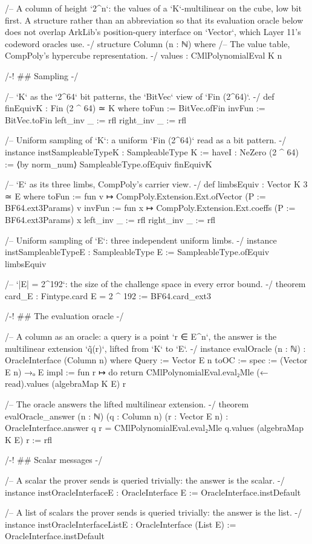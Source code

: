 \begin{leancode}
/-- A column of height `2^n`: the values of a `K`-multilinear on the cube, low bit first. A
structure rather than an abbreviation so that its evaluation oracle below does not overlap
ArkLib's position-query interface on `Vector`, which Layer 11's codeword oracles use. -/
structure Column (n : ℕ) where
  /-- The value table, CompPoly's hypercube representation. -/
  values : CMlPolynomialEval K n

/-! ## Sampling -/

/-- `K` as the `2^64` bit patterns, the `BitVec` view of `Fin (2^64)`. -/
def finEquivK : Fin (2 ^ 64) ≃ K where
  toFun := BitVec.ofFin
  invFun := BitVec.toFin
  left_inv _ := rfl
  right_inv _ := rfl

/-- Uniform sampling of `K`: a uniform `Fin (2^64)` read as a bit pattern. -/
instance instSampleableTypeK : SampleableType K :=
  haveI : NeZero (2 ^ 64) := ⟨by norm_num⟩
  SampleableType.ofEquiv finEquivK

/-- `E` as its three limbs, CompPoly's carrier view. -/
def limbsEquiv : Vector K 3 ≃ E where
  toFun := fun v ↦ CompPoly.Extension.Ext.ofVector (P := BF64.ext3Params) v
  invFun := fun x ↦ CompPoly.Extension.Ext.coeffs (P := BF64.ext3Params) x
  left_inv _ := rfl
  right_inv _ := rfl

/-- Uniform sampling of `E`: three independent uniform limbs. -/
instance instSampleableTypeE : SampleableType E := SampleableType.ofEquiv limbsEquiv

/-- `|E| = 2^192`: the size of the challenge space in every error bound. -/
theorem card_E : Fintype.card E = 2 ^ 192 := BF64.card_ext3

/-! ## The evaluation oracle -/

/-- A column as an oracle: a query is a point `r ∈ E^n`, the answer is the multilinear extension
`q̃(r)`, lifted from `K` to `E`. -/
instance evalOracle (n : ℕ) : OracleInterface (Column n) where
  Query := Vector E n
  toOC :=
    { spec := (Vector E n) →ₒ E
      impl := fun r ↦ do return CMlPolynomialEval.eval₂Mle (← read).values (algebraMap K E) r }

/-- The oracle answers the lifted multilinear extension. -/
theorem evalOracle_answer (n : ℕ) (q : Column n) (r : Vector E n) :
    OracleInterface.answer q r = CMlPolynomialEval.eval₂Mle q.values (algebraMap K E) r := rfl

/-! ## Scalar messages -/

/-- A scalar the prover sends is queried trivially: the answer is the scalar. -/
instance instOracleInterfaceE : OracleInterface E := OracleInterface.instDefault

/-- A list of scalars the prover sends is queried trivially: the answer is the list. -/
instance instOracleInterfaceListE : OracleInterface (List E) := OracleInterface.instDefault
\end{leancode}

